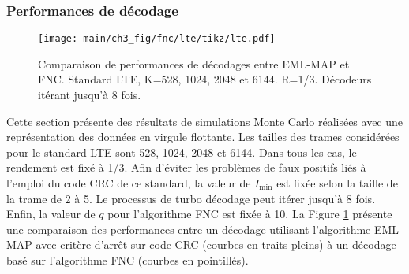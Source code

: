 \subsubsection{Performances de décodage}
\begin{figure}[!t]
	\centering
	\texttt{[image: main/ch3\_fig/fnc/lte/tikz/lte.pdf]}
	\caption{Comparaison de performances de décodages entre EML-MAP et FNC. Standard LTE, K=528, 1024, 2048 et 6144. R=1/3.
	Décodeurs itérant jusqu'à 8 fois. \label{fig:fnc_lte}}
\end{figure}
Cette section présente des résultats de simulations Monte Carlo réalisées avec une représentation des données en 
virgule flottante.
Les tailles des trames considérées pour le standard LTE sont 528, 1024, 2048 et 6144. Dans tous les cas, le rendement
est fixé à 1/3. Afin d'éviter les problèmes de
faux positifs liés à l'emploi du code CRC de ce standard, la valeur de $I_\text{min}$ est fixée selon la 
taille de la trame de 2 à 5. Le processus
de turbo décodage peut itérer jusqu'à 8 fois. Enfin, la valeur de $q$ pour l'algorithme FNC est fixée à 10. La Figure 
\ref{fig:fnc_lte} présente une comparaison des performances entre un décodage utilisant l'algorithme EML-MAP avec critère 
d'arrêt sur code CRC (courbes en traits pleins) à un décodage basé sur l'algorithme FNC (courbes en pointillés).

